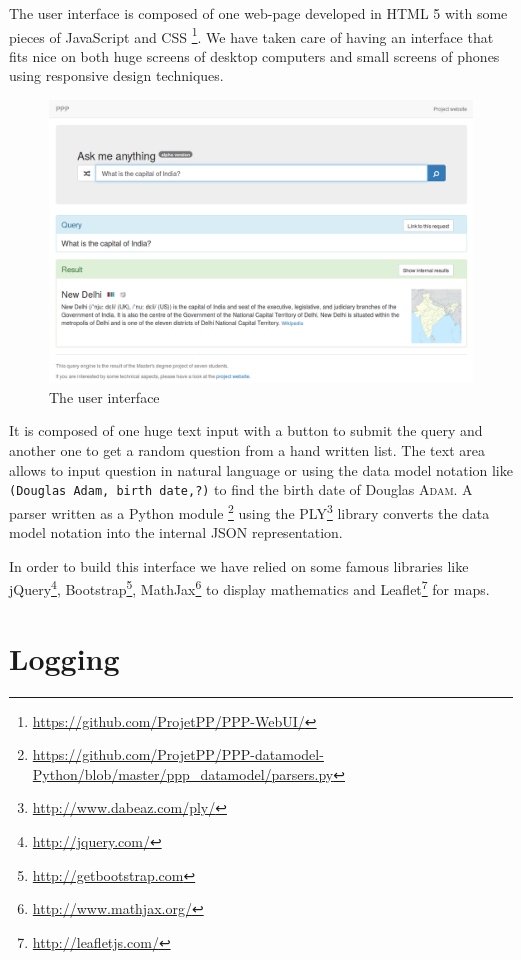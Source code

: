 The user interface is composed of one web-page developed in HTML 5 with some
pieces of JavaScript and CSS \footnote{\url{https://github.com/ProjetPP/PPP-WebUI/}}.
We have taken care of having an
interface that fits nice on both huge screens of desktop computers
and small screens of phones using responsive design techniques.

\begin{figure}[!ht]
    \centering
    \includegraphics[width=1\textwidth]{WebUI.png}
    \caption{The user interface}
\end{figure}

It is composed of one huge text input with a button to submit
the query and another one to get a random question from a hand written list. The text area
allows to input question in natural language or using the data model notation like
\texttt{(Douglas Adam, birth date,?)} to find the
birth date of Douglas \textsc{Adam}. A parser written as a Python module
\footnote{\url{https://github.com/ProjetPP/PPP-datamodel-Python/blob/master/ppp\_datamodel/parsers.py}}
using
the PLY\footnote{\url{http://www.dabeaz.com/ply/}} library converts
the data model notation into the internal JSON representation.

In order to build this interface we have relied on some famous libraries 
like jQuery\footnote{\url{http://jquery.com/}}, Bootstrap\footnote{\url{http://getbootstrap.com}}, MathJax\footnote{\url{http://www.mathjax.org/}} to display mathematics and Leaflet\footnote{\url{http://leafletjs.com/}} for maps.

\section{Logging}

